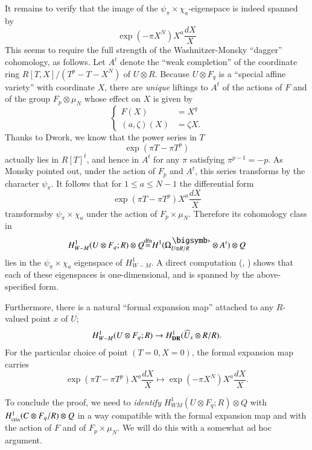 It remains to verify that the image of the $\psi_{\pi}\times \chi_{a}$-eigenspace is indeed spanned by
$$
\exp(-\pi X^{N})X^{a}\frac{dX}{X}
$$
This seems to require the full strength of the Washnitzer-Monsky ``dagger'' cohomology, as follows. Let $A^{t}$ denote the ``weak completion'' of the coordinate ring $R[T,X]/(T^{p}-T-X^{N})$ of $U\otimes R$. Because $U\otimes F_{q}$ is a ``special affine variety'' with coordinate $X$, there are {\em unique} liftings to $A^{t}$ of the actions of $F$ and of the group $F_{p}\otimes \mu_{N}$ whose effect on $X$ is given by
$$
\left\{
\begin{aligned}
F(X) &= X^{q}\\
(a,\zeta)(X) &= \zeta X.
\end{aligned}
\right.
$$
Thanks to Dwork, we know that the power series in $T$
$$
\exp (\pi T-\pi T^{p})
$$
actually lies in $R[T]^{t}$, and hence in $A^{t}$ for any $\pi$ satisfying $\pi^{p-1}=-p$. As Monsky pointed out, under the action of $F_{p}$ and $A^{t}$, this series transforms by the character $\psi_{\pi}$. It follows that for $1\leq a\leq N-1$ the differential form
$$
\exp (\pi T-\pi T^{p})X^{a}\frac{dX}{X}
$$
\eject
\noindent
transforms\pageoriginale by $\psi_{\pi}\times \chi_{a}$ under the action of $F_{p}\times \mu_{N}$. Therefore its cohomology class in
$$
H^{1}_{W-M}(U\otimes F_{q};R)\otimes Q{\displaystyle{\mathop{=}\limits^{\text{dfn}}}}H^{1}(\Omega^{\bigdot}_{U\otimes R/R}\otimes A^{t})\otimes Q
$$
lies in the $\psi_{\pi}\times \chi_{a}$ eigenspace of $H^{1}_{W-M}$. A direct computation (\cite{art6-key31}, \cite{art6-key32}) shows that each of these eigenspaces is one-dimensional, and is spanned by the above-specified form.

Furthermore, there is a natural ``formal expansion map'' attached to any $R$-valued point $x$ of $U$;
$$
H^{1}_{W-M}(U\otimes F_{q};R)\to H^{1}_{\mathbf{DR}}(\widehat{U}_{x}\otimes R/R).
$$
For the particular choice of point $(T=0,X=0)$, the formal expansion map carries
$$
\exp (\pi T-\pi T^{p})X^{a}\frac{dX}{X}\mapsto \exp (-\pi X^{N})X^{a}\dfrac{dX}{X}.
$$

To conclude the proof, we need to {\em identify} $H^{1}_{WM}(U\otimes F_{q};R)\otimes Q$ with $H^{1}_{\operatorname{cris}}(C\otimes F_{q}/R)\otimes Q$ in a way compatible with the formal expansion map and with the action of $F$ and of $F_{p}\times \mu_{N}$. We will do this with a somewhat ad hoc argument.


